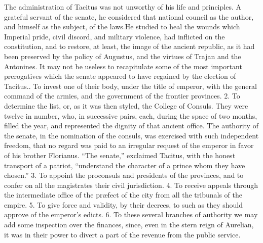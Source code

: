 
The administration of Tacitus was not unworthy of his life and
principles. A grateful servant of the senate, he considered that
national council as the author, and himself as the subject, of
the laws.\footnotemark[12] He studied to heal the wounds which Imperial pride,
civil discord, and military violence, had inflicted on the
constitution, and to restore, at least, the image of the ancient
republic, as it had been preserved by the policy of Augustus, and
the virtues of Trajan and the Antonines. It may not be useless to
recapitulate some of the most important prerogatives which the
senate appeared to have regained by the election of Tacitus.. To invest one of their body, under the title of emperor, with
the general command of the armies, and the government of the
frontier provinces. 2. To determine the list, or, as it was then
styled, the College of Consuls. They were twelve in number, who,
in successive pairs, each, during the space of two months, filled
the year, and represented the dignity of that ancient office. The
authority of the senate, in the nomination of the consuls, was
exercised with such independent freedom, that no regard was paid
to an irregular request of the emperor in favor of his brother
Florianus. “The senate,” exclaimed Tacitus, with the honest
transport of a patriot, “understand the character of a prince
whom they have chosen.” 3. To appoint the proconsuls and
presidents of the provinces, and to confer on all the magistrates
their civil jurisdiction. 4. To receive appeals through the
intermediate office of the præfect of the city from all the
tribunals of the empire. 5. To give force and validity, by their
decrees, to such as they should approve of the emperor’s edicts.
6. To these several branches of authority we may add some
inspection over the finances, since, even in the stern reign of
Aurelian, it was in their power to divert a part of the revenue
from the public service.\footnotemark[14]



